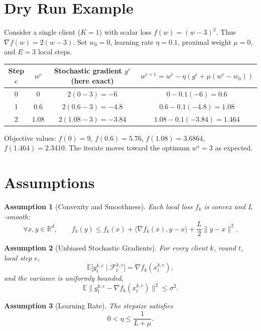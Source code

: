 \documentclass{article}
\newtheorem{assumption}{Assumption}
\newcommand{\E}{\mathbb{E}}
\newcommand{\R}{\mathbb{R}}
\begin{document}
\section*{Dry Run Example}
Consider a single client ($K=1$) with scalar loss $f(w)=(w-3)^{2}$.  
Thus $\nabla f(w)=2(w-3)$.  
Set $w_0=0$, learning rate $\eta=0.1$, proximal weight $\mu=0$, and $E=3$ local steps.

\begin{center}
\begin{tabular}{c|c|c|c}
Step $e$ & $w^{e}$ & Stochastic gradient $g^{e}$ (here exact) & $w^{e+1}=w^{e}-\eta(g^{e}+\mu(w^{e}-w_0))$\\ \hline
0 & $0$ & $2(0-3)=-6$ & $0-0.1(-6)=0.6$\\
1 & $0.6$ & $2(0.6-3)=-4.8$ & $0.6-0.1(-4.8)=1.08$\\
2 & $1.08$ & $2(1.08-3)=-3.84$ & $1.08-0.1(-3.84)=1.464$\\
\end{tabular}
\end{center}
Objective values: $f(0)=9$, $f(0.6)=5.76$, $f(1.08)=3.6864$, $f(1.464)=2.3410$.  
The iterate moves toward the optimum $w^{\star}=3$ as expected.

\newpage
\section*{Assumptions}
\begin{assumption}[Convexity and Smoothness]\label{ass:convex_smooth}
Each local loss $f_k$ is convex and $L$‑smooth:
\[
\forall x,y\in\R^{d},\qquad
f_k(y)\le f_k(x)+\langle\nabla f_k(x),y-x\rangle+\frac{L}{2}\|y-x\|^{2}.
\]
\end{assumption}

\begin{assumption}[Unbiased Stochastic Gradients]\label{ass:unbiased}
For every client $k$, round $t$, local step $e$,
\[
\E\!\bigl[g_{t}^{k,e}\mid\mathcal{F}_{t}^{k,e}\bigr]=\nabla f_k(x_{t}^{k,e}),
\]
and the variance is uniformly bounded,
\[
\E\!\bigl\|g_{t}^{k,e}-\nabla f_k(x_{t}^{k,e})\bigr\|^{2}\le\sigma^{2}.
\]
\end{assumption}

\begin{assumption}[Learning Rate]\label{ass:lr}
The stepsize satisfies
\[
0<\eta\le\frac{1}{L+\mu}.
\]
\end{assumption}
\end{document}
